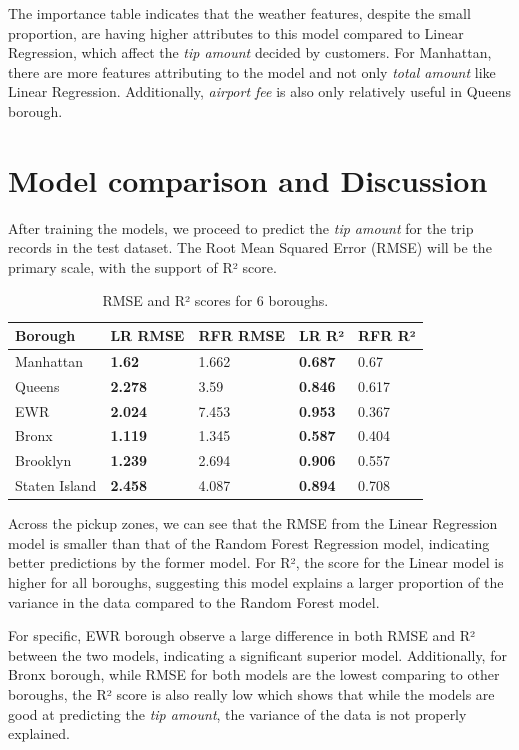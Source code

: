 \documentclass[11pt]{article}
\begin{document}
The importance table indicates that the weather features, despite the small proportion, are having higher attributes to this model compared to Linear Regression, which affect the \textit{tip amount} decided by customers. For Manhattan, there are more features attributing to the model and not only \textit{total amount} like Linear Regression. Additionally, \textit{airport fee} is also only relatively useful in Queens borough.

\section{Model comparison and Discussion}

After training the models, we proceed to predict the \textit{tip amount} for the trip records in the test dataset. The Root Mean Squared Error (RMSE) will be the primary scale, with the support of R² score.

\begin{table}[h!]
\centering
\begin{tabular}{|p{3cm}|p{2cm}|p{2.5cm}|p{2cm}|p{2cm}|}
\hline
Borough & LR RMSE & RFR RMSE & LR R² & RFR R²\\
\hline
Manhattan     & \textbf{1.62}  & 1.662 & \textbf{0.687} & 0.67\\
Queens        & \textbf{2.278} & 3.59  & \textbf{0.846} & 0.617\\
EWR           & \textbf{2.024} & 7.453 & \textbf{0.953} & 0.367\\
Bronx         & \textbf{1.119} & 1.345 & \textbf{0.587} & 0.404\\
Brooklyn      & \textbf{1.239} & 2.694 & \textbf{0.906} & 0.557\\
Staten Island & \textbf{2.458} & 4.087 & \textbf{0.894} & 0.708 \\
\hline
\end{tabular}
\caption{RMSE and R² scores for 6 boroughs.}
\label{tab:scores}
\end{table}

Across the pickup zones, we can see that the RMSE from the Linear Regression model is smaller than that of the Random Forest Regression model, indicating better predictions by the former model. For R², the score for the Linear model is higher for all boroughs, suggesting this model explains a larger proportion of the variance in the data compared to the Random Forest model. 

For specific, EWR borough observe a large difference in both RMSE and R² between the two models, indicating a significant superior model. Additionally, for Bronx borough, while RMSE for both models are the lowest comparing to other boroughs, the R² score is also really low which shows that while the models are good at predicting the \textit{tip amount}, the variance of the data is not properly explained.
\end{document}
